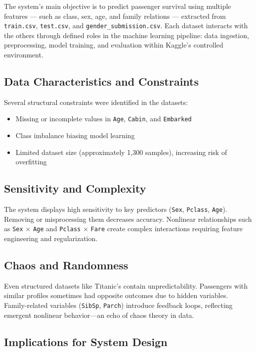 \documentclass[12pt]{report}
\begin{document}
The system’s main objective is to predict passenger survival using multiple features — such as class, sex, age, and family relations — extracted from \texttt{train.csv}, \texttt{test.csv}, and \texttt{gender\_submission.csv}. Each dataset interacts with the others through defined roles in the machine learning pipeline: data ingestion, preprocessing, model training, and evaluation within Kaggle’s controlled environment.

\subsection*{Data Characteristics and Constraints}

Several structural constraints were identified in the datasets:
\begin{itemize}
    \item Missing or incomplete values in \texttt{Age}, \texttt{Cabin}, and \texttt{Embarked}
    \item Class imbalance biasing model learning
    \item Limited dataset size (approximately 1,300 samples), increasing risk of overfitting
\end{itemize}

\subsection*{Sensitivity and Complexity}

The system displays high sensitivity to key predictors (\texttt{Sex}, \texttt{Pclass}, \texttt{Age}). Removing or misprocessing them decreases accuracy. Nonlinear relationships such as \texttt{Sex} $\times$ \texttt{Age} and \texttt{Pclass} $\times$ \texttt{Fare} create complex interactions requiring feature engineering and regularization.

\subsection*{Chaos and Randomness}

Even structured datasets like Titanic’s contain unpredictability. Passengers with similar profiles sometimes had opposite outcomes due to hidden variables. Family-related variables (\texttt{SibSp}, \texttt{Parch}) introduce feedback loops, reflecting emergent nonlinear behavior—an echo of chaos theory in data.

\subsection*{Implications for System Design}
\end{document}
